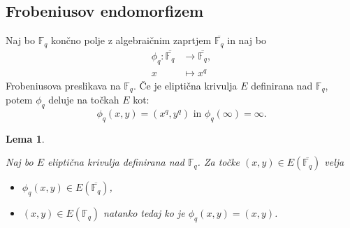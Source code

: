 \documentclass[12pt,a4paper,twoside]{article}
\theoremstyle{definition} %
\theoremstyle{plain} %
\newtheorem{lema}[definicija]{Lema}
\numberwithin{equation}{section}  %
\newcommand{\F}{\mathbb F}
\newcommand{\E}[1]{E({#1})}
\begin{document}
\subsection{Frobeniusov endomorfizem}

Naj bo $\F_q$ končno polje z algebraičnim zaprtjem $\overline{\F_q}$ in naj bo
\begin{align}
\phi_q:\overline{\F_q} &{} \rightarrow \overline{\F_q}, \nonumber \\
x &{} \mapsto x^q \nonumber
\end{align}
Frobeniusova preslikava na $\F_q$.
Če je eliptična krivulja $E$ definirana nad $\F_q$, potem $\phi_q$ deluje na točkah $E$ kot:
$$\phi_q(x,y) = (x^q,y^q) \text{ in } \phi_q(\infty) = \infty.$$

\begin{lema}~

\label{lema:4.5}

Naj bo $E$ eliptična krivulja definirana nad $\F_q$. Za točke $(x,y) \in \E{\overline{\F_q}}$ velja
\begin{itemize}

\item $\phi_q(x,y) \in \E{\overline{\F_q}}$,
\item $(x,y) \in \E{\F_q}$ natanko tedaj ko je $\phi_q(x,y) = (x,y)$.


\end{itemize}

\end{lema}
\end{document}

